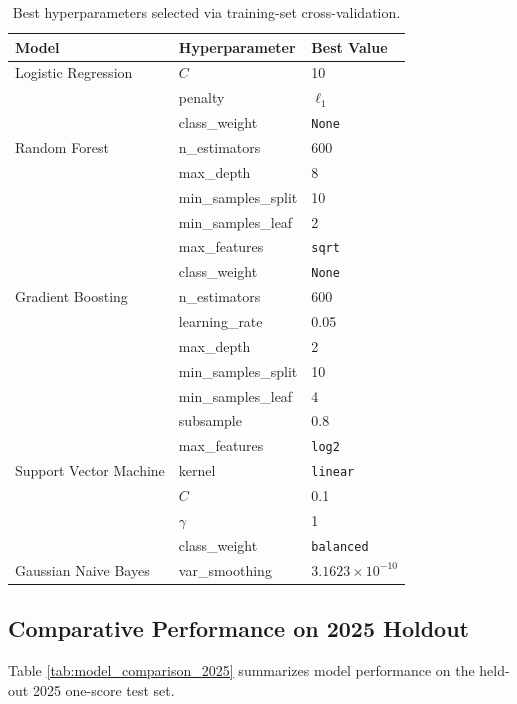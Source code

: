 \documentclass[11pt]{amsart}
\theoremstyle{definition}                  %
\theoremstyle{remark}                       %
\numberwithin{equation}{section}
\begin{document}
\begin{table}[h!]
\centering
\small
\begin{tabular}{lll}
\toprule
\textbf{Model} & \textbf{Hyperparameter} & \textbf{Best Value} \\
\midrule
Logistic Regression & $C$ & 10 \\
                    & penalty & $\ell_1$ \\
                    & class\_weight & \texttt{None} \\
\addlinespace[0.25em]
Random Forest & n\_estimators & 600 \\
              & max\_depth & 8 \\
              & min\_samples\_split & 10 \\
              & min\_samples\_leaf & 2 \\
              & max\_features & \texttt{sqrt} \\
              & class\_weight & \texttt{None} \\
\addlinespace[0.25em]
Gradient Boosting & n\_estimators & 600 \\
                  & learning\_rate & 0.05 \\
                  & max\_depth & 2 \\
                  & min\_samples\_split & 10 \\
                  & min\_samples\_leaf & 4 \\
                  & subsample & 0.8 \\
                  & max\_features & \texttt{log2} \\
\addlinespace[0.25em]
Support Vector Machine & kernel & \texttt{linear} \\
                       & $C$ & 0.1 \\
                       & $\gamma$ & 1 \\
                       & class\_weight & \texttt{balanced} \\
\addlinespace[0.25em]
Gaussian Naive Bayes & var\_smoothing & $3.1623 \times 10^{-10}$ \\
\bottomrule
\end{tabular}
\caption{Best hyperparameters selected via training-set cross-validation.}
\label{tab:best_hyperparameters}
\end{table}
\FloatBarrier

\subsection{Comparative Performance on 2025 Holdout}
Table \ref{tab:model_comparison_2025} summarizes model performance on the held-out 2025 one-score test set.
\end{document}
